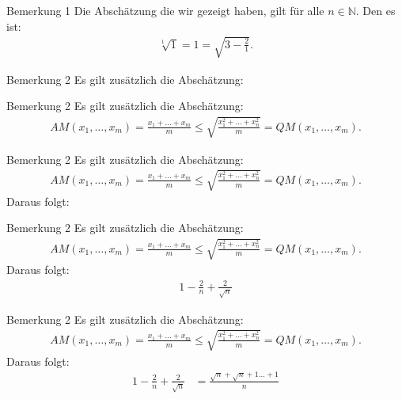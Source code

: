 \documentclass[10pt]{beamer}
\def\bN{\mathbb{N}}
\begin{document}
\begin{frame}{Bemerkung 1}
    Die Abschätzung die wir gezeigt haben, gilt für alle \( n \in \bN \). Den es ist: 
    \begin{align*}
        \sqrt[1]{1}
        = 1
        = \sqrt{3 - \frac{2}{1}}.
    \end{align*}
\end{frame}



\begin{frame}{Bemerkung 2}
    Es gilt zusätzlich die Abschätzung:
\end{frame}



\begin{frame}{Bemerkung 2}
    Es gilt zusätzlich die Abschätzung:
    \begin{align*}
        AM( x_{1}, \ldots, x_{m} )
        = \frac{x_{1} + \ldots + x_{m}}{m}
        \leq \sqrt{\frac{x_{1}^{2} + \ldots + x_{n}^{2}}{m}} 
      	= QM( x_{1}, \ldots, x_{m} ).
    \end{align*}
\end{frame}



\begin{frame}{Bemerkung 2}
    Es gilt zusätzlich die Abschätzung:
    \begin{align*}
        AM( x_{1}, \ldots, x_{m} )
        = \frac{x_{1} + \ldots + x_{m}}{m}
        \leq \sqrt{\frac{x_{1}^{2} + \ldots + x_{n}^{2}}{m}} 
      	= QM( x_{1}, \ldots, x_{m} ).
    \end{align*}
    Daraus folgt:
\end{frame}



\begin{frame}{Bemerkung 2}
    Es gilt zusätzlich die Abschätzung:
    \begin{align*}
        AM( x_{1}, \ldots, x_{m} )
        = \frac{x_{1} + \ldots + x_{m}}{m}
        \leq \sqrt{\frac{x_{1}^{2} + \ldots + x_{n}^{2}}{m}} 
      	= QM( x_{1}, \ldots, x_{m} ).
    \end{align*}
    Daraus folgt:
    \begin{align*}
        1 - \frac{2}{n} + \frac{2}{\sqrt{n}}
    \end{align*}
\end{frame}



\begin{frame}{Bemerkung 2}
    Es gilt zusätzlich die Abschätzung:
    \begin{align*}
        AM( x_{1}, \ldots, x_{m} )
        = \frac{x_{1} + \ldots + x_{m}}{m}
        \leq \sqrt{\frac{x_{1}^{2} + \ldots + x_{n}^{2}}{m}} 
      	= QM( x_{1}, \ldots, x_{m} ).
    \end{align*}
    Daraus folgt:
    \begin{align*}
        1 - \frac{2}{n} + \frac{2}{\sqrt{n}}
        & = \frac{\sqrt{n} + \sqrt{n} + 1 \ldots + 1}{n} \\
    \end{align*}
\end{frame}
\end{document}
